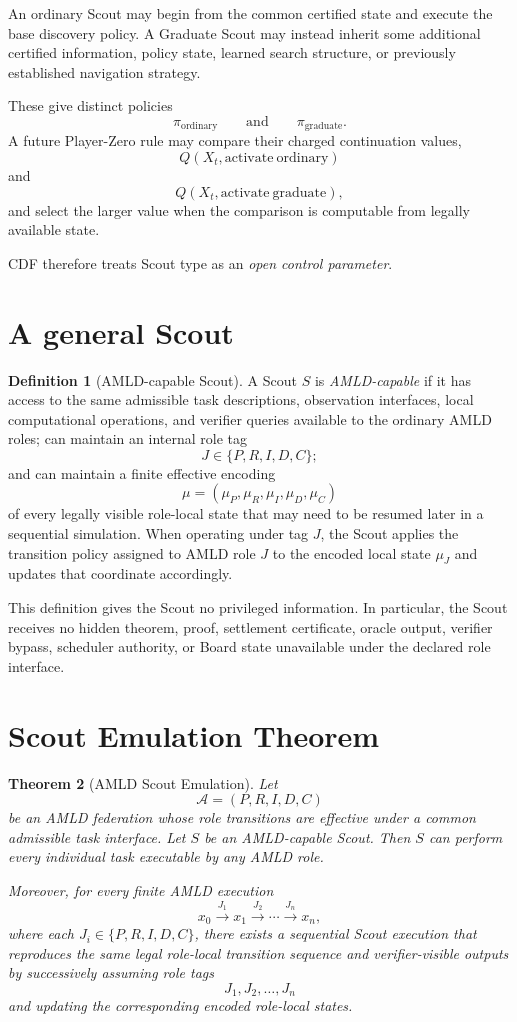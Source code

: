 \documentclass[11pt]{article}
\newtheorem{theorem}{Theorem}[section]
\theoremstyle{definition}
\newtheorem{definition}[theorem]{Definition}
\begin{document}
An ordinary Scout may begin from the common certified state and execute the base discovery policy. A Graduate Scout may instead inherit some additional certified information, policy state, learned search structure, or previously established navigation strategy.

These give distinct policies
\[
\pi_{\mathrm{ordinary}}
\qquad\text{and}\qquad
\pi_{\mathrm{graduate}}.
\]
A future Player-Zero rule may compare their charged continuation values,
\[
Q(X_t,\mathrm{activate\ ordinary})
\]
and
\[
Q(X_t,\mathrm{activate\ graduate}),
\]
and select the larger value when the comparison is computable from legally available state.

CDF therefore treats Scout type as an \emph{open control parameter}.

\section{A general Scout}

\begin{definition}[AMLD-capable Scout]
A Scout $S$ is \emph{AMLD-capable} if it has access to the same admissible task descriptions, observation interfaces, local computational operations, and verifier queries available to the ordinary AMLD roles; can maintain an internal role tag
\[
J\in\{P,R,I,D,C\};
\]
and can maintain a finite effective encoding
\[
\mu=(\mu_P,\mu_R,\mu_I,\mu_D,\mu_C)
\]
of every legally visible role-local state that may need to be resumed later in a sequential simulation. When operating under tag $J$, the Scout applies the transition policy assigned to AMLD role $J$ to the encoded local state $\mu_J$ and updates that coordinate accordingly.
\end{definition}

This definition gives the Scout no privileged information. In particular, the Scout receives no hidden theorem, proof, settlement certificate, oracle output, verifier bypass, scheduler authority, or Board state unavailable under the declared role interface.

\section{Scout Emulation Theorem}

\begin{theorem}[AMLD Scout Emulation]
Let
\[
\mathcal A=(P,R,I,D,C)
\]
be an AMLD federation whose role transitions are effective under a common admissible task interface. Let $S$ be an AMLD-capable Scout. Then $S$ can perform every individual task executable by any AMLD role.

Moreover, for every finite AMLD execution
\[
x_0\xrightarrow{J_1}x_1\xrightarrow{J_2}\cdots\xrightarrow{J_n}x_n,
\]
where each $J_i\in\{P,R,I,D,C\}$, there exists a sequential Scout execution that reproduces the same legal role-local transition sequence and verifier-visible outputs by successively assuming role tags
\[
J_1,J_2,\ldots,J_n
\]
and updating the corresponding encoded role-local states.
\end{theorem}
\end{document}
